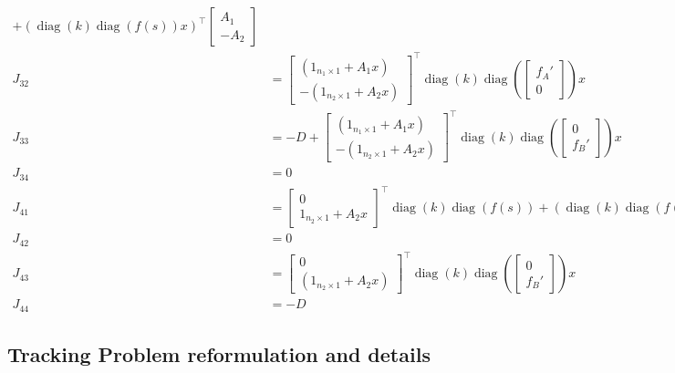 \documentclass[3p,times]{article}
\DeclareMathOperator{\diag}{diag}
\begin{document}
\begin{align}
+  (\diag(k)\diag(f(s))x)^\top \begin{bmatrix}A_1 \\ -A_2\end{bmatrix} \\
J_{32} &= \begin{bmatrix}\left(1_{n_1 \times 1} + A_1x\right)\\ -\left(1_{n_2 \times 1} + A_2x\right)\end{bmatrix}^\top \diag(k) \diag\left( \begin{bmatrix}
f_A' \\ 0\end{bmatrix}\right)x \\
J_{33} &= -D + \begin{bmatrix} \left(1_{n_1 \times 1} + A_1x\right) \\ -\left(1_{n_2\times 1}+ A_2x\right) \end{bmatrix}^\top \diag(k)\diag\left(
\begin{bmatrix}
0 \\ f_B'
\end{bmatrix}\right)x  \\
J_{34} &= 0 \\
J_{41} &= \begin{bmatrix}0 \\ 1_{n_2 \times 1} + A_2x \end{bmatrix}^\top\diag(k) \diag(f(s)) 
+ (\diag(k)\diag(f(s))x)^\top\begin{bmatrix} 
0 \\ A_2
\end{bmatrix} \\
J_{42} &= 0 \\
J_{43} &= \begin{bmatrix} 0 \\(1_{n_2\times 1} + A_2x) \end{bmatrix}^\top \diag(k) \diag\left(\begin{bmatrix}
0 \\ f_B'
\end{bmatrix}\right) x \\
J_{44} &= -D
\end{align}

\subsection{Tracking Problem reformulation and details}
\end{document}
